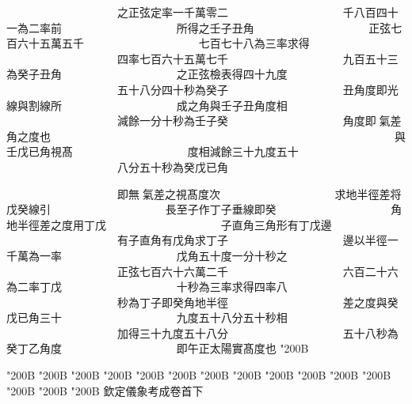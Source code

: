 \begin{正文}
　　　　　　　　　　之正弦定率一千萬零二
　　　　　　　　　　千八百四十一為二率前
　　　　　　　　　　所得之壬子丑角
　　　　　　　　　　正弦七百六十五萬五千
　　　　　　　　　　七百七十八為三率求得
　　　　　　　　　　四率七百六十五萬七千
　　　　　　　　　　九百五十三為癸子丑角
　　　　　　　　　　之正弦檢表得四十九度
　　　　　　　　　　五十八分四十秒為癸子
　　　　　　　　　　丑角度即光線與割線所
　　　　　　　　　　成之角與壬子丑角度相
　　　　　　　　　　減餘一分十秒為壬子癸
　　　　　　　　　　角度即𫎇氣差角之度也
　　　　　　　　　　與壬戊已角視髙
　　　　　　　　　　度相減餘三十九度五十
　　　　　　　　　　八分五十秒為癸戊已角
\par
\end{正文}\clearpage
{}
\begin{正文}
　　　　　　　　　　即無𫎇氣差之視髙度次
　　　　　　　　　　求地半徑差将戊癸線引
　　　　　　　　　　長至子作丁子垂線即癸
　　　　　　　　　　角地半徑差之度用丁戊
　　　　　　　　　　子直角三角形有丁戊邊
　　　　　　　　　　有子直角有戊角求丁子
　　　　　　　　　　邊以半徑一千萬為一率
　　　　　　　　　　戊角五十度一分十秒之
　　　　　　　　　　正弦七百六十六萬二千
　　　　　　　　　　六百二十六為二率丁戊
　　　　　　　　　　十秒為三率求得四率八
　　　　　　　　　　秒為丁子即癸角地半徑
　　　　　　　　　　差之度與癸戊已角三十
　　　　　　　　　　九度五十八分五十秒相
　　　　　　　　　　加得三十九度五十八分
　　　　　　　　　　五十八秒為癸丁乙角度
　　　　　　　　　　即午正太陽實髙度也
\char"200B\relax
\par
\end{正文}\clearpage
{}
\begin{正文}
\char"200B\relax{}
\char"200B\relax{}
\char"200B\relax{}
\char"200B\relax{}
\char"200B\relax{}
\char"200B\relax{}
\char"200B\relax{}
\char"200B\relax{}
\char"200B\relax{}
\char"200B\relax{}
\char"200B\relax{}
\char"200B\relax{}
\char"200B\relax{}
\char"200B\relax{}
\char"200B\relax{}
欽定儀象考成卷首下
\par

\par\end{正文}\clearpage
